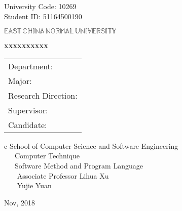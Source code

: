 \newpage

\pagestyle{empty}

\hskip 1.83cm {\large University Code: 10269}\\
\hspace*{\fill} {\large Student ID: 51164500190 }

\vskip 2cm

\begin{center}
{\Huge $\mathbb{EAST}\,\mathbb{CHINA}\,\mathbb{NORMAL}\,
\mathbb{UNIVERSITY}$}
\end{center}

\vskip 3cm

\begin{center}
\bfseries{\scshape{\huge xxxxxxxxxx}}\\
\end{center}

\vskip 2cm {\large
\begin{center}
\begin{tabular}{l}
Department:\\
Major:\\ 
Research Direction:\\
Supervisor:\\
Candidate:
\end{tabular}
\begin{tabular}c
\normalsize{School of Computer Science and Software Engineering}\\
\hline ~~~Computer Technique    \\
\hline ~~~Software Method and Program Language\\
\hline ~~~ Associate Professor Lihua Xu\\
\hline ~~~  Yujie  Yuan\\
\hline
\end{tabular}
\end{center}}

\vskip 30mm

\begin{center}
{\Large Nov, 2018}
\end{center}
